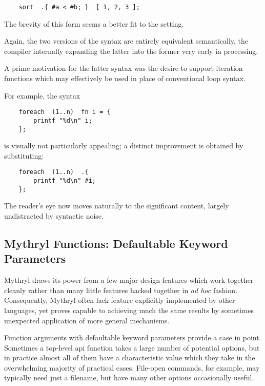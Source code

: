 \begin{verbatim}
    sort  .{ #a < #b; }  [ 1, 2, 3 ];
\end{verbatim}

The brevity of this form seems a better fit to the setting.

Again, the two versions of the syntax are entirely equivalent semantically, 
the compiler internally expanding the latter into the former very early in processing.

A prime motivation for the latter syntax was the desire to support iteration 
functions which may effectively be used in place of conventional loop syntax.

For example, the syntax

\begin{verbatim}
    foreach  (1..n)  fn i = {
        printf "%d\n" i;
    };
\end{verbatim}

is visually not particularly appealing;  a distinct improvement is obtained 
by substituting:

\begin{verbatim}
    foreach  (1..n)  .{
        printf "%d\n" #i;
    };
\end{verbatim}

The reader's eye now moves naturally to the significant 
content, largely undistracted by syntactic noise.


\cutend*

\subsection{Mythryl Functions:  Defaultable Keyword Parameters}

Mythryl draws its power from a few major design features which work together 
cleanly rather than many little features hacked together in {\it ad hoc} 
fashion.  Consequently, Mythryl often lack feature explicitly implemented 
by other languages, yet proves capable to achieving much the same results 
by sometimes unexpected application of more general mechanisms.

Function arguments with defaultable keyword parameters provide a case in 
point.  Sometimes a top-level api function takes a large number of potential 
options, but in practice almost all of them have a characteristic value which 
they take in the overwhelming majority of practical cases.  File-open commands, 
for example, may typically need just a filename, but have many other options 
occasionally useful.

